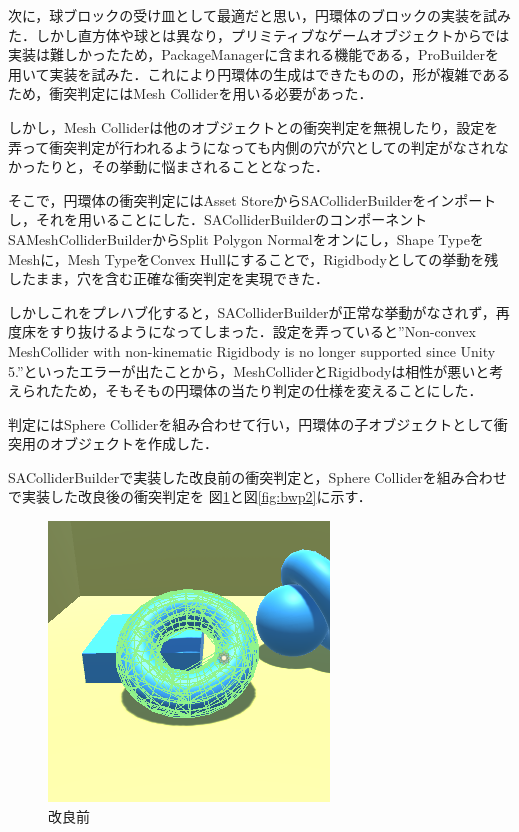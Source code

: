 \documentclass[uplatex,12pt]{jsarticle}
\begin{document}
次に，球ブロックの受け皿として最適だと思い，円環体のブロックの実装を試みた．しかし直方体や球とは異なり，プリミティブなゲームオブジェクトからでは実装は難しかったため，PackageManagerに含まれる機能である，ProBuilderを用いて実装を試みた．これにより円環体の生成はできたものの，形が複雑であるため，衝突判定にはMesh Colliderを用いる必要があった．

しかし，Mesh Colliderは他のオブジェクトとの衝突判定を無視したり，設定を弄って衝突判定が行われるようになっても内側の穴が穴としての判定がなされなかったりと，その挙動に悩まされることとなった．

そこで，円環体の衝突判定にはAsset StoreからSAColliderBuilderをインポートし，それを用いることにした．SAColliderBuilderのコンポーネントSAMeshColliderBuilderからSplit Polygon Normalをオンにし，Shape TypeをMeshに，Mesh TypeをConvex Hullにすることで，Rigidbodyとしての挙動を残したまま，穴を含む正確な衝突判定を実現できた．

しかしこれをプレハブ化すると，SAColliderBuilderが正常な挙動がなされず，再度床をすり抜けるようになってしまった．設定を弄っていると''Non-convex MeshCollider with non-kinematic Rigidbody is no longer supported since Unity 5.''といったエラーが出たことから，MeshColliderとRigidbodyは相性が悪いと考えられたため，そもそもの円環体の当たり判定の仕様を変えることにした．

判定にはSphere Colliderを組み合わせて行い，円環体の子オブジェクトとして衝突用のオブジェクトを作成した．

SAColliderBuilderで実装した改良前の衝突判定と，Sphere Colliderを組み合わせで実装した改良後の衝突判定を
図\ref{fig:bwp1}と図\ref{fig:bwp2}に示す．

\begin{figure}[!hbt]
  	\begin{center}
  		\includegraphics[scale=0.55]{images/bwp1.png}
	\end{center}
  	\caption{改良前}
  	\label{fig:bwp1}
\end{figure}
\end{document}
